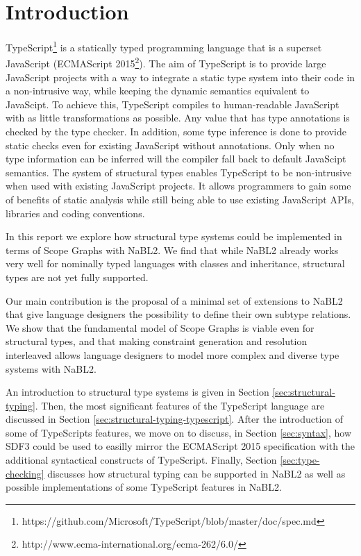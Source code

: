\section{Introduction}

TypeScript\footnote{https://github.com/Microsoft/TypeScript/blob/master/doc/spec.md} is a statically typed programming language that is a superset JavaScript (ECMAScript 2015\footnote{http://www.ecma-international.org/ecma-262/6.0/}).
The aim of TypeScript is to provide large JavaScript projects with a way to integrate a static 
type system into their code in a non-intrusive way, 
while keeping the dynamic semantics equivalent to JavaScipt.
To achieve this, TypeScript compiles to human-readable JavaScript with as little transformations as possible.
Any value that has type annotations is checked by the type checker.
In addition, some type inference is done to provide static checks even for existing JavaScript without annotations.
Only when no type information can be inferred will the compiler fall back to default JavaScipt semantics.
The system of structural types enables TypeScript to be non-intrusive when used with existing JavaScript projects.
It allows programmers to gain some of benefits of static analysis while still 
being able to use existing JavaScript APIs, libraries and coding conventions.

In this report we explore how structural type systems could be implemented in terms of Scope 
Graphs with NaBL2\citep{Antwerpen:2016:CLS:2847538.2847543}.
We find that while NaBL2 already works very well for nominally typed languages with classes and inheritance,
structural types are not yet fully supported. 

Our main contribution is the proposal of a minimal set of extensions to NaBL2 that 
give language designers the possibility to define their own subtype relations. 
We show that the fundamental model of Scope Graphs is viable even for structural types, 
and that making constraint generation and resolution interleaved
allows language designers to model more complex and diverse type systems with NaBL2.

An introduction to structural type systems is given in Section \ref{sec:structural-typing}.
Then, the most significant features of the TypeScript language are discussed in Section \ref{sec:structural-typing-typescript}.
After the introduction of some of TypeScripts features, we move on to discuss, in Section \ref{sec:syntax}, how SDF3 could be used to 
easilly mirror the ECMAScript 2015 specification with the additional syntactical constructs of TypeScript.
Finally, Section \ref{sec:type-checking} discusses how structural typing can be supported in NaBL2 
as well as possible implementations of some TypeScript features in NaBL2.
